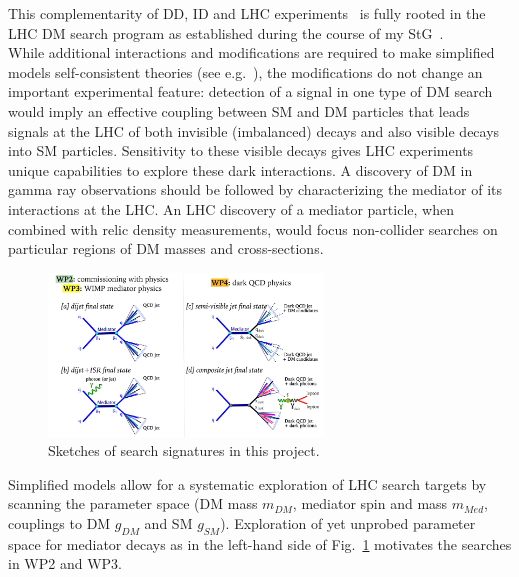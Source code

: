 This complementarity of DD, ID and LHC experiments~\cite{Bauer:2013ihz} is fully rooted in the LHC DM search program as established during the course of my StG~\cite{Boveia:2016mrp}.
\\
While additional interactions and modifications are required to make simplified models self-consistent theories (see e.g.~\cite{Ellis:2018xal}), the modifications do not change an important experimental feature: detection of a signal in one type of DM search would imply an effective coupling between SM and DM particles that leads signals at the LHC of both invisible (imbalanced) decays and also visible decays into SM particles. 
Sensitivity to these visible decays gives LHC experiments unique capabilities to explore these dark interactions.
A discovery of DM in gamma ray observations should be followed by characterizing the mediator of its interactions at the LHC.
An LHC discovery of a mediator particle, when combined with relic density measurements, would focus non-collider searches on particular regions of DM masses and cross-sections.

\begin{figure} 
\begin{center}
\includegraphics[width=0.65\textwidth]{figs_B2/feynman.pdf}
\caption{Sketches of search signatures in this project.\color{black}\label{fig:feynman} }
\end{center}
\vskip-10pt
\end{figure}

Simplified models allow for a systematic exploration of LHC search targets by scanning the parameter space (DM mass $m_{DM}$, mediator spin and mass $m_{Med}$, couplings to DM $g_{DM}$ and SM $g_{SM}$).
Exploration of yet unprobed parameter space for mediator decays as in the left-hand side of Fig.~\ref{fig:feynman} motivates the searches in WP2 and WP3. 


